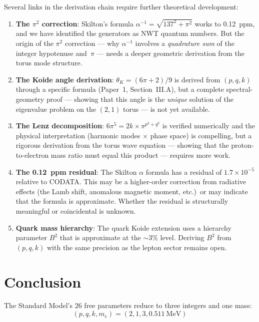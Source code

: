 \documentclass[11pt,a4paper]{article}
\begin{document}
Several links in the derivation chain require further theoretical development:
\begin{enumerate}
  \item \textbf{The $\pi^2$ correction}: Skilton's formula $\alpha^{-1} = \sqrt{137^2 + \pi^2}$ works to 0.12~ppm, and we have identified the generators as NWT quantum numbers. But the origin of the $\pi^2$ correction --- why $\alpha^{-1}$ involves a \emph{quadrature sum} of the integer hypotenuse and~$\pi$ --- needs a deeper geometric derivation from the torus mode structure.

  \item \textbf{The Koide angle derivation}: $\theta_K = (6\pi+2)/9$ is derived from $(p, q, k)$ through a specific formula (Paper~1, Section~III.A), but a complete spectral-geometry proof --- showing that this angle is the \emph{unique} solution of the eigenvalue problem on the $(2,1)$ torus --- is not yet available.

  \item \textbf{The Lenz decomposition}: $6\pi^5 = 2k \times \pi^{p^2+q^2}$ is verified numerically and the physical interpretation (harmonic modes $\times$ phase space) is compelling, but a rigorous derivation from the torus wave equation --- showing that the proton-to-electron mass ratio must equal this product --- requires more work.

  \item \textbf{The 0.12~ppm residual}: The Skilton $\alpha$ formula has a residual of $1.7 \times 10^{-5}$ relative to CODATA. This may be a higher-order correction from radiative effects (the Lamb shift, anomalous magnetic moment, etc.)\ or may indicate that the formula is approximate. Whether the residual is structurally meaningful or coincidental is unknown.

  \item \textbf{Quark mass hierarchy}: The quark Koide extension uses a hierarchy parameter $B^2$ that is approximate at the ${\sim}3\%$ level. Deriving $B^2$ from $(p, q, k)$ with the same precision as the lepton sector remains open.
\end{enumerate}

\section{Conclusion}
\label{sec:conclusion}

The Standard Model's 26 free parameters reduce to three integers and one mass:
\begin{equation}
  (p, q, k, m_e) = (2, 1, 3, 0.511~\text{MeV})
\end{equation}
\end{document}
